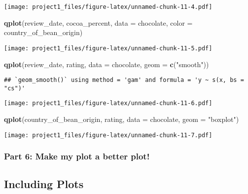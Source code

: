 \documentclass[
]{article}
\newenvironment{Shaded}{\begin{snugshade}}{\end{snugshade}}
\newcommand{\AttributeTok}[1]{\textcolor[rgb]{0.13,0.29,0.53}{#1}}
\newcommand{\FunctionTok}[1]{\textcolor[rgb]{0.13,0.29,0.53}{\textbf{#1}}}
\newcommand{\NormalTok}[1]{#1}
\newcommand{\StringTok}[1]{\textcolor[rgb]{0.31,0.60,0.02}{#1}}
\begin{document}
\texttt{[image: project1\_files/figure-latex/unnamed-chunk-11-4.pdf]}

\begin{Shaded}
\begin{Highlighting}[]
\FunctionTok{qplot}\NormalTok{(review\_date, cocoa\_percent, }\AttributeTok{data =}\NormalTok{ chocolate, }\AttributeTok{color =}\NormalTok{ country\_of\_bean\_origin)}
\end{Highlighting}
\end{Shaded}

\texttt{[image: project1\_files/figure-latex/unnamed-chunk-11-5.pdf]}

\begin{Shaded}
\begin{Highlighting}[]
\FunctionTok{qplot}\NormalTok{(review\_date, rating, }\AttributeTok{data =}\NormalTok{ chocolate, }\AttributeTok{geom =} \FunctionTok{c}\NormalTok{(}\StringTok{"smooth"}\NormalTok{))}
\end{Highlighting}
\end{Shaded}

\begin{verbatim}
## `geom_smooth()` using method = 'gam' and formula = 'y ~ s(x, bs = "cs")'
\end{verbatim}

\texttt{[image: project1\_files/figure-latex/unnamed-chunk-11-6.pdf]}

\begin{Shaded}
\begin{Highlighting}[]
\FunctionTok{qplot}\NormalTok{(country\_of\_bean\_origin, rating, }\AttributeTok{data =}\NormalTok{ chocolate, }\AttributeTok{geom =} \StringTok{"boxplot"}\NormalTok{)}
\end{Highlighting}
\end{Shaded}

\texttt{[image: project1\_files/figure-latex/unnamed-chunk-11-7.pdf]}

\hypertarget{part-6-make-my-plot-a-better-plot}{%
\subsubsection{Part 6: Make my plot a better
plot!}\label{part-6-make-my-plot-a-better-plot}}

\hypertarget{including-plots}{%
\subsection{Including Plots}\label{including-plots}}
\end{document}
